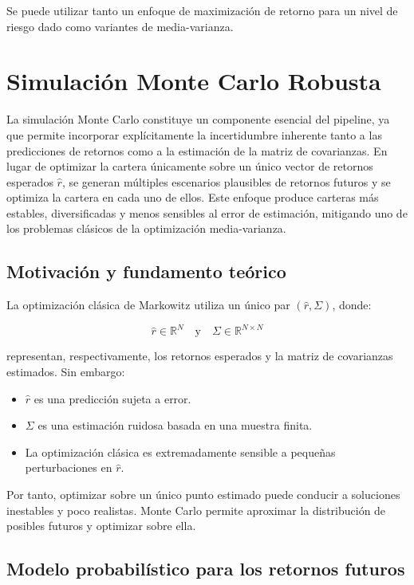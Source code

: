\documentclass[12pt]{article}
\begin{document}
Se puede utilizar tanto un enfoque de maximización de retorno para un nivel de riesgo dado como variantes de media-varianza.

\section{Simulación Monte Carlo Robusta}

La simulación Monte Carlo constituye un componente esencial del pipeline, ya que permite incorporar explícitamente la incertidumbre inherente tanto a las predicciones de retornos como a la estimación de la matriz de covarianzas. En lugar de optimizar la cartera únicamente sobre un único vector de retornos esperados $\hat{r}$, se generan múltiples escenarios plausibles de retornos futuros y se optimiza la cartera en cada uno de ellos. Este enfoque produce carteras más estables, diversificadas y menos sensibles al error de estimación, mitigando uno de los problemas clásicos de la optimización media-varianza.

\subsection{Motivación y fundamento teórico}

La optimización clásica de Markowitz utiliza un único par $(\hat{r}, \Sigma)$, donde:



\[
\hat{r} \in \mathbb{R}^N \quad \text{y} \quad \Sigma \in \mathbb{R}^{N \times N}
\]



representan, respectivamente, los retornos esperados y la matriz de covarianzas estimados.  
Sin embargo:

\begin{itemize}
    \item $\hat{r}$ es una predicción sujeta a error.
    \item $\Sigma$ es una estimación ruidosa basada en una muestra finita.
    \item La optimización clásica es extremadamente sensible a pequeñas perturbaciones en $\hat{r}$.
\end{itemize}

Por tanto, optimizar sobre un único punto estimado puede conducir a soluciones inestables y poco realistas.  
Monte Carlo permite aproximar la distribución de posibles futuros y optimizar sobre ella.

\subsection{Modelo probabilístico para los retornos futuros}
\end{document}
